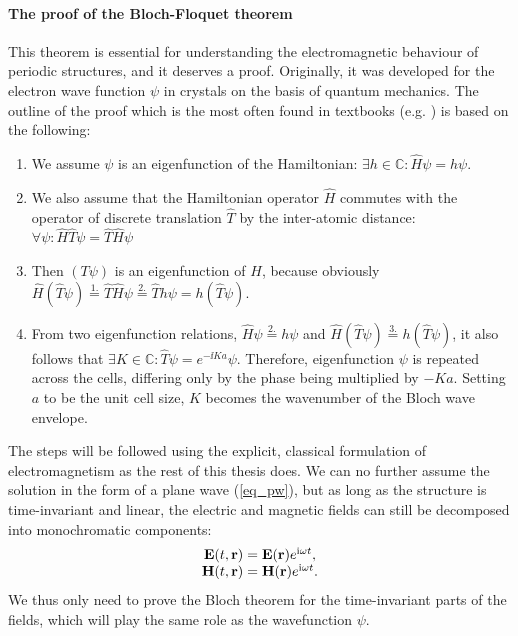 \paragraph{The proof of the Bloch-Floquet theorem}%
This theorem is essential for understanding the electromagnetic behaviour of periodic structures, and it deserves a proof. Originally, it was developed for the electron wave function $\psi$ in crystals on the basis of quantum mechanics. The outline of the proof which is the most often found in textbooks (e.g. \cite[p. 134]{ashcroft2005solid}) is based on the following:
\begin{enumerate}
 \item{We assume $\psi$ is an eigenfunction of the Hamiltonian: $\exists h\in \mathbb{C}: \hat H\psi = h\psi$.} 
 \item{We also assume that the Hamiltonian operator $\hat H$ commutes with the operator of discrete translation $\hat T$ by the inter-atomic distance: $\forall \psi: \hat H\hat T\psi = \hat T\hat H\psi$ } 
 \item{Then $(T\psi)$ is an eigenfunction of $H$, because obviously $\hat H(\hat T\psi) \stackrel{1.}{=} \hat T\hat H\psi \stackrel{2.}{=} \hat Th\psi = h(\hat T\psi)$.}
 \item{From two eigenfunction relations, $\hat H\psi\stackrel{2.}{=} h\psi$ and $\hat H(\hat T\psi) \stackrel{3.}{=} h(\hat T\psi)$, it also follows that 
$\exists K\in \mathbb{C}: \hat T\psi = e^{-\ii Ka}\psi$.  Therefore, eigenfunction $\psi$ is repeated across the cells, differing only by the phase being multiplied by $-Ka$. Setting $a$ to be the unit cell size, $K$ becomes the wavenumber of the Bloch wave envelope.
}
 \end{enumerate}
The steps will be followed using the explicit, classical formulation of electromagnetism as the rest of this thesis does. We can no further assume the solution in the form of a plane wave (\ref{eq_pw}), but as long as the structure is time-invariant and linear, the electric and magnetic fields can still be decomposed into monochromatic components:
\begin{equation} 
\begin{array}{cc}
\mathbf{E}(t, {\mathbf{r}}) = \mathbf{E}({\mathbf{r}}) e^{{\mathrm i} \omega t}, \\
\mathbf{H}(t, {\mathbf{r}}) = \mathbf{H}({\mathbf{r}}) e^{{\mathrm i} \omega t}. 
\end{array}
\label{eq_harmonic}\end{equation}
We thus only need to prove the Bloch theorem for the time-invariant parts of the fields, which will play the same role as the wavefunction $\psi$.

